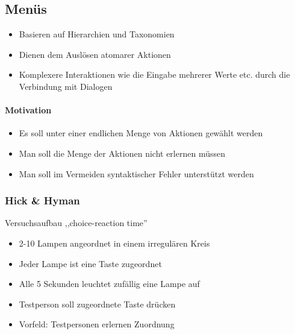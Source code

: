 \documentclass[8pt,a4paper,landscape]{extarticle}
\begin{document}
\begin{multicols*}{4}
	\subsection{Menüs}
	\begin{itemize}
		\item Basieren auf Hierarchien und Taxonomien
		\item Dienen dem Auslösen atomarer Aktionen
		\item Komplexere Interaktionen wie die Eingabe mehrerer Werte etc.
		      durch die Verbindung mit Dialogen
	\end{itemize}
	\paragraph{Motivation}
	\begin{itemize}
		\item Es soll unter einer endlichen Menge von Aktionen gewählt werden
		\item Man soll die Menge der Aktionen nicht erlernen müssen
		\item Man soll im Vermeiden syntaktischer Fehler unterstützt werden
	\end{itemize}
	\subsubsection{Hick \& Hyman}
	Versuchsaufbau ,,choice-reaction time''
	\begin{itemize}
		\item 2-10 Lampen angeordnet in einem irregulären Kreis
		\item Jeder Lampe ist eine Taste zugeordnet
		\item Alle 5 Sekunden leuchtet zufällig eine Lampe auf
		\item Testperson soll zugeordnete Taste drücken
		\item Vorfeld: Testpersonen erlernen Zuordnung
	\end{itemize}

\end{multicols*}
\end{document}
